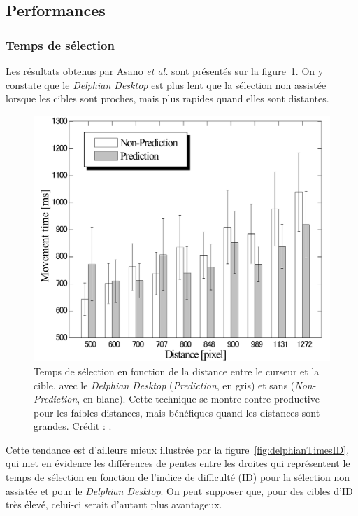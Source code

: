 	\subsection{Performances}
	\subsubsection{Temps de sélection}
	Les résultats obtenus par Asano \emph{et al.}\cite{asano2005predictive} sont présentés sur la figure~\ref{fig:delphianTimes}. On y constate que le \emph{Delphian Desktop} est plus lent que la sélection non assistée lorsque les cibles sont proches, mais plus rapides quand elles sont distantes.
	
	\begin{figure}[H]
		\centering
		\includegraphics[width=\textwidth]{figures/ch2/delphianTimes}
		\caption[\emph{Delphian Desktop} --- temps de sélection]{Temps de sélection en fonction de la distance entre le curseur et la cible, avec le \emph{Delphian Desktop} (\emph{Prediction}, en gris) et sans (\emph{Non-Prediction}, en blanc). Cette technique se montre contre-productive pour les faibles distances, mais bénéfiques quand les distances sont grandes. Crédit : \cite{asano2005predictive}.}
		\label{fig:delphianTimes}
	\end{figure}

	Cette tendance est d'ailleurs mieux illustrée par la figure~\ref{fig:delphianTimesID}, qui met en évidence les différences de pentes entre les droites qui représentent le temps de sélection en fonction de l'indice de difficulté (ID) pour la sélection non assistée et pour le \emph{Delphian Desktop}. On peut supposer que, pour des cibles d'ID très élevé, celui-ci serait d'autant plus avantageux.
	

